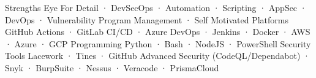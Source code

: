 


\begin{cvaboutme}
    \cvabout
        {Strengths}
        {Eye For Detail · DevSecOps · Automation · Scripting · AppSec · DevOps · Vulnerability Program Management · Self Motivated}
    \cvabout
        {Platforms}
        {GitHub Actions · GitLab CI/CD · Azure DevOps · Jenkins · Docker · AWS · Azure · GCP}
    \cvabout
        {Programming}
        {Python · Bash · NodeJS · PowerShell}
    \cvabout
        {Security Tools}
        {Lacework · Tines · GitHub Advanced Security (CodeQL/Dependabot) · Snyk · BurpSuite · Nessus · Veracode · PrismaCloud}
\cvsubsection{}
\end{cvaboutme}
